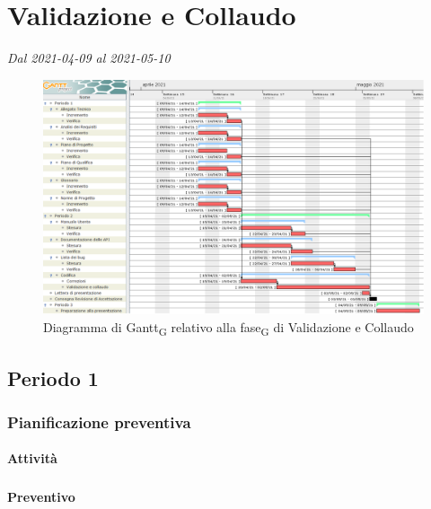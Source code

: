 \section{Validazione e Collaudo}
\textit{Dal 2021-04-09 al 2021-05-10}


\begin{figure}[H]
	\centering
	\includegraphics[scale=0.45]{res/images/gantt_fase/06_gantt_validazione}
	\caption{Diagramma di Gantt\textsubscript{G} relativo alla fase\textsubscript{G} di Validazione e Collaudo}
\end{figure}


\subsection{Periodo 1}

\subsubsection{Pianificazione preventiva}

\paragraph{Attività}
\subparagraph*{}

\planningTable{
	
}

\paragraph{Preventivo}
\subparagraph*{}

